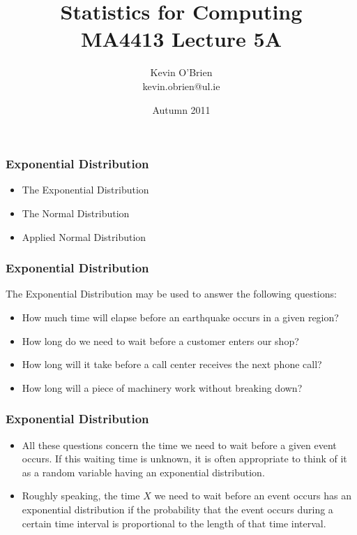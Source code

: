 \documentclass[a4]{beamer}
\title[MA4413]{Statistics for Computing \\ {\normalsize MA4413 Lecture 5A}}
\author[Kevin O'Brien]{Kevin O'Brien \\ {\scriptsize kevin.obrien@ul.ie}}
\date{Autumn 2011}
\institute[Maths \& Stats]{Dept. of Mathematics \& Statistics, \\ University \textit{of} Limerick}
\begin{document}
\begin{frame}
\titlepage
\end{frame}
\begin{frame}[fragile]
\frametitle{Exponential Distribution}
\begin{itemize}
\item The Exponential Distribution
\item The Normal Distribution
\item Applied Normal Distribution
\end{itemize}
\end{frame}

\begin{frame}[fragile]
\frametitle{Exponential Distribution}
The Exponential Distribution may be used to answer the following questions:
\begin{itemize}
\item How much time will elapse before an earthquake occurs in a given region?
\item How long do we need to wait before a customer enters our shop?
\item How long will it take before a call center receives the next phone call?
\item How long will a piece of machinery work without breaking down?
\end{itemize}
\end{frame}  

\begin{frame}[fragile]
\frametitle{Exponential Distribution}

\begin{itemize}
\item All these questions concern the time we need to wait before a given event occurs. If this waiting time is unknown, it is often appropriate to think of it as a random variable having an exponential distribution.
\item Roughly speaking, the time $X$ we need to wait before an event occurs has an exponential distribution if the probability that the event occurs during a certain time interval is proportional to the length of that time interval.

\end{itemize}
\end{frame}
\end{document}

